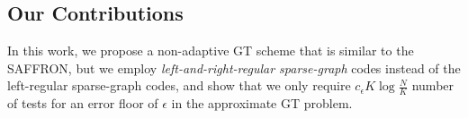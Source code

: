 \documentclass[conference,twocolumn]{IEEEtran}
\begin{document}
\subsection*{Our Contributions}
In this work, we propose a non-adaptive GT scheme that is similar to the SAFFRON, but we employ \textit{left-and-right-regular sparse-graph} codes instead of the left-regular sparse-graph codes, and show that we only require $c_\epsilon K\log \frac{N}{K}$ number of tests for an error floor of $\epsilon$ in the approximate GT problem.
\end{document}

